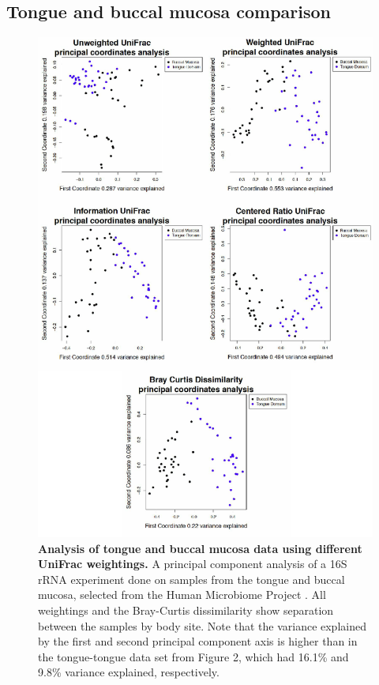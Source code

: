 \documentclass[10pt,letterpaper]{article}
\begin{document}
\FloatBarrier

\subsection{Tongue and buccal mucosa comparison}

\begin{figure}[h]
\includegraphics[scale=0.8]{tongue_cheek.eps}
\caption{{\bf Analysis of tongue and buccal mucosa data using different UniFrac weightings. }
A principal component analysis of a 16S rRNA experiment done on samples from the tongue and buccal mucosa, selected from the Human Microbiome Project \cite{turnbaugh2007human}. All weightings and the Bray-Curtis dissimilarity show separation between the samples by body site. Note that the variance explained by the first and second principal component axis is higher than in the tongue-tongue data set from Figure 2, which had 16.1\% and 9.8\% variance explained, respectively.}
\label{fig6}
\end{figure}
\end{document}
